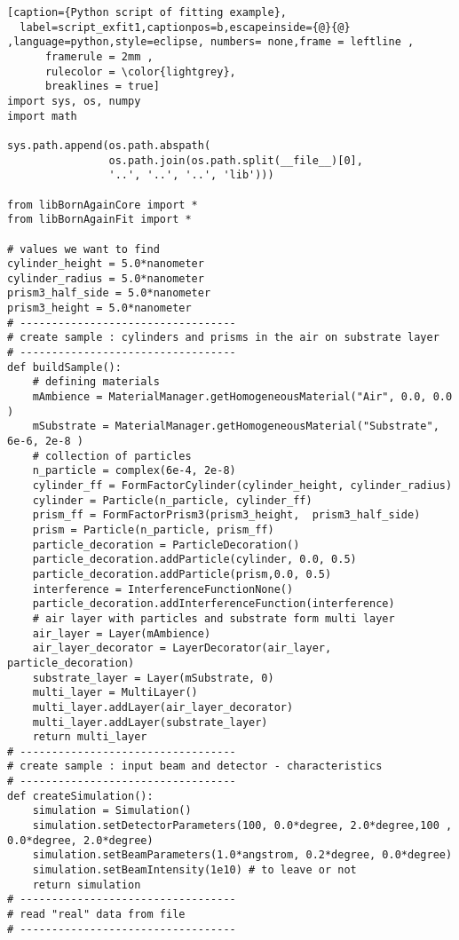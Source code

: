 \begin{lstlisting}[caption={Python script of fitting example},
  label=script_exfit1,captionpos=b,escapeinside={@}{@} ,language=python,style=eclipse, numbers= none,frame = leftline ,
      framerule = 2mm ,
      rulecolor = \color{lightgrey},
      breaklines = true]
import sys, os, numpy
import math 

sys.path.append(os.path.abspath(
                os.path.join(os.path.split(__file__)[0],
                '..', '..', '..', 'lib')))

from libBornAgainCore import *
from libBornAgainFit import *

# values we want to find
cylinder_height = 5.0*nanometer
cylinder_radius = 5.0*nanometer
prism3_half_side = 5.0*nanometer
prism3_height = 5.0*nanometer
# ----------------------------------
# create sample : cylinders and prisms in the air on substrate layer
# ----------------------------------
def buildSample(): 
    # defining materials
    mAmbience = MaterialManager.getHomogeneousMaterial("Air", 0.0, 0.0 )
    mSubstrate = MaterialManager.getHomogeneousMaterial("Substrate", 6e-6, 2e-8 )
    # collection of particles
    n_particle = complex(6e-4, 2e-8)
    cylinder_ff = FormFactorCylinder(cylinder_height, cylinder_radius)
    cylinder = Particle(n_particle, cylinder_ff)
    prism_ff = FormFactorPrism3(prism3_height,  prism3_half_side)
    prism = Particle(n_particle, prism_ff)
    particle_decoration = ParticleDecoration()
    particle_decoration.addParticle(cylinder, 0.0, 0.5)
    particle_decoration.addParticle(prism,0.0, 0.5)  
    interference = InterferenceFunctionNone()
    particle_decoration.addInterferenceFunction(interference)
    # air layer with particles and substrate form multi layer
    air_layer = Layer(mAmbience)
    air_layer_decorator = LayerDecorator(air_layer, particle_decoration)
    substrate_layer = Layer(mSubstrate, 0)
    multi_layer = MultiLayer()
    multi_layer.addLayer(air_layer_decorator)
    multi_layer.addLayer(substrate_layer)
    return multi_layer
# ----------------------------------
# create sample : input beam and detector - characteristics
# ----------------------------------
def createSimulation():
    simulation = Simulation()
    simulation.setDetectorParameters(100, 0.0*degree, 2.0*degree,100 , 0.0*degree, 2.0*degree)
    simulation.setBeamParameters(1.0*angstrom, 0.2*degree, 0.0*degree)
    simulation.setBeamIntensity(1e10) # to leave or not
    return simulation
# ----------------------------------
# read "real" data from file
# ----------------------------------

\end{lstlisting}
